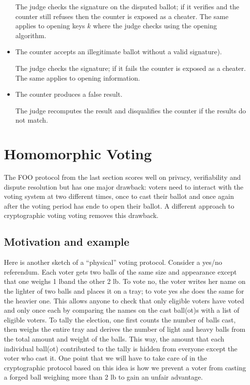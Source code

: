\documentclass{llncs}
\begin{document}
\begin{itemize}
The judge checks the signature on the disputed ballot; if it verifies and the
counter still refuses then the counter is exposed as a cheater. The same applies
to opening keys $k$ where the judge checks using the opening algorithm.

\item The counter accepts an illegitimate ballot without a valid signature).

The judge checks the signature; if it fails the counter is exposed as a cheater.
The same applies to opening information.

\item The counter produces a false result.

The judge recomputes the result and disqualifies the counter if the results do
not match.
\end{itemize}

\section{Homomorphic Voting}

The FOO protocol from the last section scores well on privacy, verifiability and
dispute resolution but has one major drawback: voters need to interact with the
voting system at two different times, once to cast their ballot and once again
after the voting period has ende to open their ballot. A different approach to
cryptographic voting voting removes this drawback.

\subsection{Motivation and example}

Here is another sketch of a ``physical'' voting protocol. Consider a yes/no
referendum. Each voter gets two balls of the same size and appearance except
that one weighs 1 lb\footnotemark and the other 2 lb. To vote no, the voter
writes her name on the lighter of two balls and places it on a tray; to vote yes
she does the same for the heavier one. This allows anyone to check that only
eligible voters have voted and only once each by comparing the names on the cast
ball(ot)s with a list of eligible voters. To tally the election, one first
counts the number of balls cast, then weighs the entire tray and derives the
number of light and heavy balls from the total amount and weight of the balls.
This way, the amount that each individual ball(ot) contributed to the tally is
hidden from everyone except the voter who cast it. One point that we will have
to take care of in the cryptographic protocol based on this idea is how we
prevent a voter from casting a forged ball weighing more than 2 lb to gain an
unfair advantage.
\end{document}
